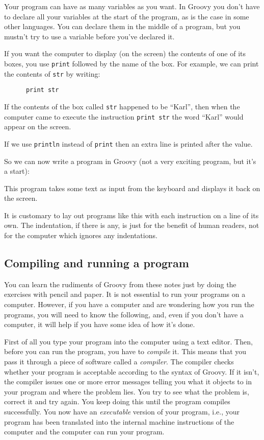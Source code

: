 Your program can have as many variables as you want.  In Groovy you don't
have to declare all your variables at the start of the program, as is the
case in some other languages.  You can declare them in the middle of a
program, but you mustn't try to use a variable before you've declared it.

If you want the computer to display (on the screen) the contents of one of
its boxes, you use \verb!print! followed by the name
of the box.  For example, we can print the contents of \verb!str! by writing:

\begin{Verbatim}
      print str
\end{Verbatim}

If the contents of the box called \verb!str! happened to be ``Karl'', then when the
computer came to execute the instruction \verb!print str! the word ``Karl'' would appear
on the screen.  

If we use \verb!println! instead of \verb!print! then an extra line is
printed after the value. 

So we can now write a program in Groovy (not a very exciting program,
but it's a start):


This program takes some text as input from the keyboard and displays it
back on the screen.

It is customary to lay out programs like this with each instruction on a line 
of its own. The indentation, if there is any, is just for the benefit
of human readers, not for the computer which ignores any indentations. 

\subsection{Compiling and running a program}

You can learn the rudiments of Groovy from these notes just by doing the
exercises with pencil and paper.  It is not essential to run your programs
on a computer.  However, if you have a computer and are wondering how
you run the programs, you will need to know the following, and, even if you don't have
a computer, it will help if you have some idea of how it's done.

First of all you type your program into the computer using a text
editor. Then, 
before you can run the program, you have to \emph{compile} it.  This means that
you pass it through a piece
of software called a \emph{compiler}.  The compiler checks whether your program
is acceptable according to the syntax of Groovy.  If it isn't, the compiler
issues one or more error messages telling you
what it objects to in your program and where the problem lies.
You try to see what the problem is, correct it and try again.  You keep
doing this until the program compiles successfully.  You now have an
{\em executable} version of your program, i.e., your program has been translated
into the internal machine instructions of the computer and the computer
can run your program.


